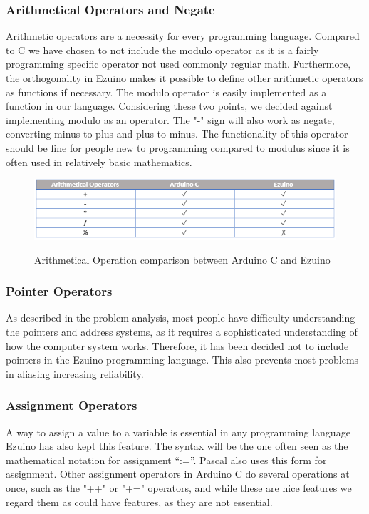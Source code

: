 \subsubsection*{Arithmetical Operators and Negate}
Arithmetic operators are a necessity for every programming language.
Compared to C we have chosen to not include the modulo operator as it is a fairly programming specific operator not used commonly regular math. Furthermore, the orthogonality in Ezuino makes it possible to define other arithmetic operators as functions if necessary. The modulo operator is easily implemented as a function in our language. Considering these two points, we decided against implementing modulo as an operator.
The "-" sign will also work as negate, converting minus to plus and plus to minus. The functionality of this operator should be fine for people new to programming compared to modulus since it is often used in relatively basic mathematics.
\begin{figure}[H]
\centering
\caption{Arithmetical Operation comparison between Arduino C and Ezuino}
\includegraphics[scale=0.80]{figures/language_features/langf05.png}
\label{lf05}
\end{figure}

\subsubsection*{Pointer Operators}
As described in the problem analysis, most people have difficulty understanding the pointers and address systems, as it requires a sophisticated understanding of how the computer system works. Therefore, it has been decided not to include pointers in the Ezuino programming language. This also prevents most problems in aliasing increasing reliability.
\subsubsection*{Assignment Operators}
A way to assign a value to a variable is essential in any programming language Ezuino has also kept this feature. The syntax will be the one often seen as the mathematical notation for assignment “:=”. Pascal also uses this form for assignment. Other assignment operators in Arduino C do several operations at once, such as the "++" or "+=" operators, and while these are nice features we regard them as could have features, as they are not essential.


